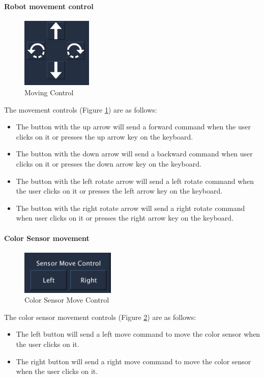 \documentclass[12pt,a4paper]{article}
\begin{document}
\paragraph {Robot movement control}\label{MOVINGCONTROL}
\begin{figure}[!htb]
\centering
\includegraphics[width=0.3\textwidth]{ControlPanel}
\caption{Moving Control}
\label{moving control}
\end{figure}
The movement controls (Figure \ref{moving control}) are as follows:
\begin{itemize} 
\item The button with the up arrow will send a forward command when the user clicks on it or presses the up arrow key on the keyboard.
\item The button with the down arrow will send a backward command when user clicks on it or presses the down arrow key on the keyboard.
\item The button with the left rotate arrow will send a left rotate command when the user clicks on it or presses the left arrow key on the keyboard.
\item The button with the right rotate arrow will send a right rotate command when user clicks on it or presses the right arrow key on the keyboard.  
\end{itemize}

\paragraph{Color Sensor movement}\label{COLORMOVE} 
\begin{figure}[!htb]
\centering
\includegraphics[width=0.4\textwidth]{SensorMove}
\caption{Color Sensor Move Control}
\label{color move}
\end{figure}
The color sensor movement controls (Figure \ref{color move}) are as follows:
\begin{itemize}
\item The left button will send a left move command to move the color sensor when the user clicks on it.
\item The right button will send a right move command to move the color sensor when the user clicks on it.
\end{itemize}
\end{document}
